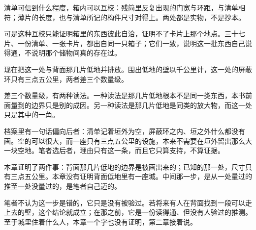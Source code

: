 清单可信到什么程度，箱内可以互校：残简里反复出现的门宽与环距，与清单相符；薄片的长度，也与清单所记的构件尺寸对得上。两处都是实物，不是抄本。

可是这种互校只能证明箱里的东西彼此自洽，证明不了卡片上那个地点。三十七片、一份清单、一张卡片，都出自同一只箱子；它们一致，说明这一批东西自己说得通，不说明那个储物间真的存在过。

现在把这一处与背面那几片低地并排放。围出低地的壁以千公里计，这一处的屏蔽环只有三点五公里，两者差三个数量级。

差三个数量级，有两种读法。一种读法是那几片低地根本不是同一类东西，本书前面量到的边界只是别的成因。另一种读法是那几片低地是同类的放大物，而这一处只是其中的一角。

档案里有一句话偏向后者：清单记着垣外为空，屏蔽环之内、垣之外什么都没有画。空的可以很大，而一座只有三点五公里的设施，本来不需要在垣外留出那么大一块空地。笔者选后者，理由只有这一条，而且它只算支持，不算证据。

本章证明了两件事：背面那几片低地的边界是被画出来的；已知的那一处，尺寸只有三点五公里。本章没有证明背面低地里有一座城。中间那一步，是从一处量过的推至一处没量过的，是笔者自己迈的。

笔者不认为这一步是错的，它只是没有被验过。若将来有人在背面找到一段可以走上去的壁，这个结论就成立；在那之前，它是一份读得通、但没有人验过的推测。至于城里住着什么人，本章一个字也没有证明，第二章接着说。
